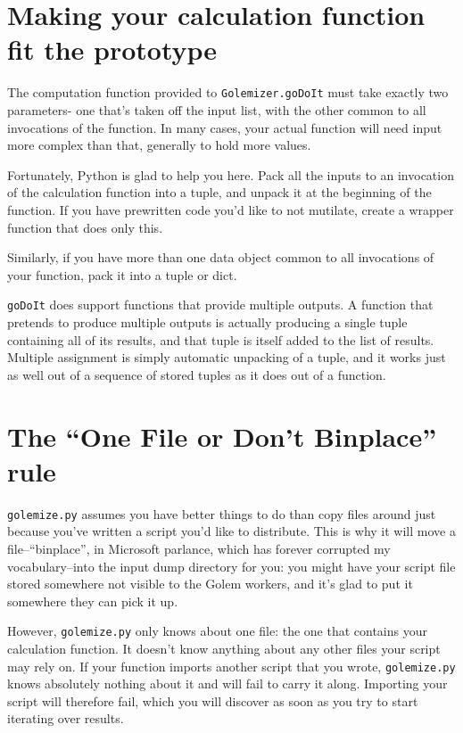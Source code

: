 \documentclass[11pt,ebook,oneside,final]{memoir} %
\begin{document}
\section{Making your calculation function fit the prototype}
The computation function provided to \texttt{Golemizer.goDoIt} must take exactly two parameters- one that's taken off the input list, with the other common to all invocations of the function. In many cases, your actual function will need input more complex than that, generally to hold more values.

Fortunately, Python is glad to help you here. Pack all the inputs to an invocation of the calculation function into a tuple, and unpack it at the beginning of the function. If you have prewritten code you'd like to not mutilate, create a wrapper function that does only this.

Similarly, if you have more than one data object common to all invocations of your function, pack it into a tuple or dict.

\texttt{goDoIt} does support functions that provide multiple outputs. A function that pretends to produce multiple outputs is actually producing a single tuple containing all of its results, and that tuple is itself added to the list of results. Multiple assignment is simply automatic unpacking of a tuple, and it works just as well out of a sequence of stored tuples as it does out of a function.

\section{The ``One File or Don't Binplace'' rule}
\texttt{golemize.py} assumes you have better things to do than copy files around just because you've written a script you'd like to distribute. This is why it will move a file--``binplace'', in Microsoft parlance, which has forever corrupted my vocabulary--into the input dump directory for you: you might have your script file stored somewhere not visible to the Golem workers, and it's glad to put it somewhere they can pick it up.

However, \texttt{golemize.py} only knows about one file: the one that contains your calculation function. It doesn't know anything about any other files your script may rely on. If your function imports another script that you wrote, \texttt{golemize.py} knows absolutely nothing about it and will fail to carry it along. Importing your script will therefore fail, which you will discover as soon as you try to start iterating over results.
\end{document}
